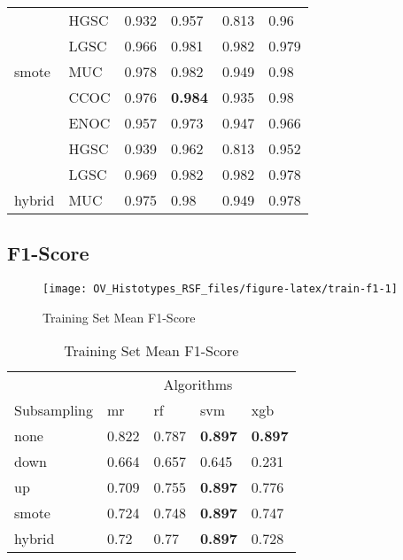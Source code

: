 \documentclass[
]{report}
\begin{document}
\begin{table}
\begin{tabular}[t]{l|l|l|l|l|l}
\cline{2-6}
 & HGSC & 0.932 & 0.957 & 0.813 & 0.96\\
\cline{2-6}
 & LGSC & 0.966 & 0.981 & 0.982 & 0.979\\
\cline{2-6}
\multirow{-5}{*}{\raggedright\arraybackslash smote} & MUC & 0.978 & 0.982 & 0.949 & 0.98\\
\cline{1-6}
 & CCOC & 0.976 & \textbf{0.984} & 0.935 & 0.98\\
\cline{2-6}
 & ENOC & 0.957 & 0.973 & 0.947 & 0.966\\
\cline{2-6}
 & HGSC & 0.939 & 0.962 & 0.813 & 0.952\\
\cline{2-6}
 & LGSC & 0.969 & 0.982 & 0.982 & 0.978\\
\cline{2-6}
\multirow{-5}{*}{\raggedright\arraybackslash hybrid} & MUC & 0.975 & 0.98 & 0.949 & 0.978\\
\hline
\end{tabular}
\end{table}

\hypertarget{f1-score}{%
\subsection{F1-Score}\label{f1-score}}

\begin{figure}[H]

{\centering \texttt{[image: OV\_Histotypes\_RSF\_files/figure-latex/train-f1-1]} 

}

\caption{Training Set Mean F1-Score}\label{fig:train-f1}
\end{figure}

\begin{table}

\caption{\label{tab:train-f1-table}Training Set Mean F1-Score}
\centering
\begin{tabular}[t]{l|l|l|l|l}
\hline
\multicolumn{1}{c|}{ } & \multicolumn{4}{c}{Algorithms} \\
\cline{2-5}
Subsampling & mr & rf & svm & xgb\\
\hline
none & 0.822 & 0.787 & \textbf{0.897} & \textbf{0.897}\\
\hline
down & 0.664 & 0.657 & 0.645 & 0.231\\
\hline
up & 0.709 & 0.755 & \textbf{0.897} & 0.776\\
\hline
smote & 0.724 & 0.748 & \textbf{0.897} & 0.747\\
\hline
hybrid & 0.72 & 0.77 & \textbf{0.897} & 0.728\\
\hline
\end{tabular}
\end{table}
\end{document}
